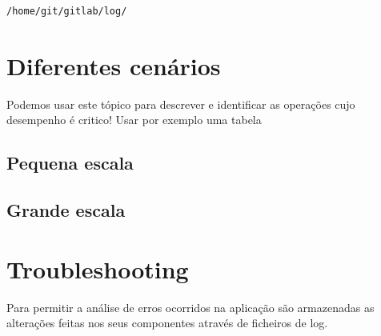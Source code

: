 \documentclass[12pt,a4paper]{article}
\begin{document}
\begin{verbatim}
/home/git/gitlab/log/
\end{verbatim}








\newpage
\section{Diferentes cenários}

Podemos usar este tópico para descrever e identificar as operações cujo desempenho é critico!
Usar por exemplo uma tabela 

\subsection{Pequena escala}
\subsection{Grande escala}


















\iffalse
\newpage
\section{Troubleshooting}

Para permitir a análise de erros ocorridos na aplicação são armazenadas as alterações feitas nos seus componentes através de ficheiros de log.
\newpage
\end{document}
